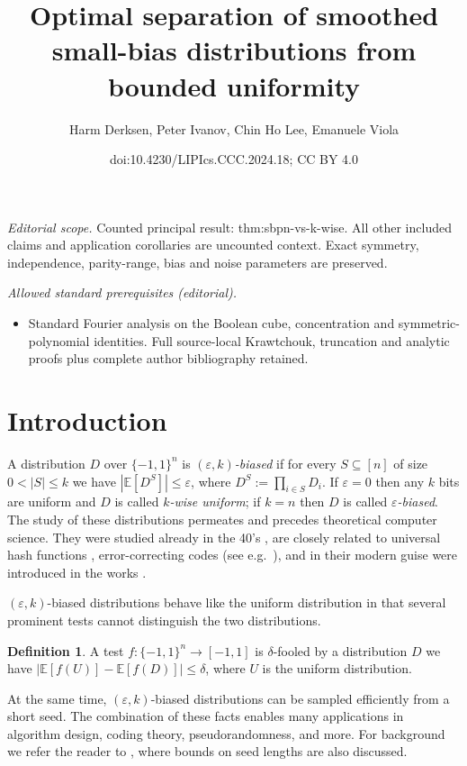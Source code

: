 \documentclass[10pt,a4paper]{article}
\title{Optimal separation of smoothed small-bias distributions from bounded uniformity}
\author{Harm Derksen, Peter Ivanov, Chin Ho Lee, Emanuele Viola}
\date{doi:10.4230/LIPIcs.CCC.2024.18; CC BY 4.0}
\theoremstyle{definition}
\newtheorem{definition}[theorem]{Definition}
\newcommand{\eps}{\epsilon}
\newcommand{\pmo}{\{-1,1\}}
\def\epsilon{\varepsilon}
\begin{document}
\maketitle
\noindent\textit{Editorial scope.} Counted principal result: thm:sbpn-vs-k-wise. All other included claims and application corollaries are uncounted context. Exact symmetry, independence, parity-range, bias and noise parameters are preserved.\par\medskip
\noindent\textit{Allowed standard prerequisites (editorial).}\begin{itemize}
\item Standard Fourier analysis on the Boolean cube, concentration and symmetric-polynomial identities. Full source-local Krawtchouk, truncation and analytic proofs plus complete author bibliography retained.
\end{itemize}\medskip
\section{Introduction}
A distribution $D$ over $\{-1,1\}^n$ is \emph{$(\eps,k)$-biased} if for every $S \subseteq [n]$ of size $0 < |S| \le k$ we have $|\mathbb{E}[D^S]| \le \eps$, where $D^S := \prod_{i\in S} D_i$.  If $\eps = 0$ then any $k$ bits are uniform and $D$ is called \emph{$k$-wise uniform}; if $k = n$ then $D$ is called \emph{$\eps$-biased}.  The study of these distributions permeates and precedes theoretical computer science.  They were studied already in the 40's \cite{MR22821}, are closely related to universal hash functions \cite{CaW79}, error-correcting codes (see e.g.~\cite{DBLP:journals/eccc/HatamiH23}), and in their modern guise were introduced in the works \cite{ABI86,ChorGoHaFrRuSm85,NaN90}.

$(\eps,k)$-biased distributions behave like the uniform distribution in that several prominent tests cannot distinguish the two distributions.


\begin{definition} A test $f\colon \pmo^n \to [-1,1]$ is $\delta$-fooled by a distribution $D$ we have $|\mathbb{E}[f(U)] - \mathbb{E}[f(D)]|\le \delta$, where $U$ is the uniform distribution.
\end{definition}

At the same time, $(\eps,k)$-biased distributions can be sampled efficiently from a short seed. The combination of these facts enables many applications in algorithm design, coding theory, pseudorandomness, and more. For background we refer the reader to \cite{Vadhan12,DBLP:journals/eccc/HatamiH23,moti}, where bounds on seed lengths are also discussed.
\end{document}
